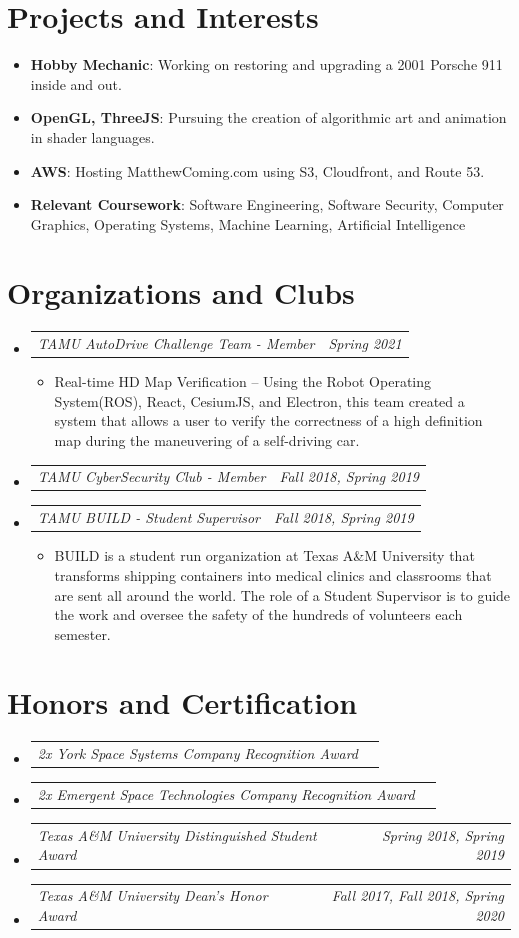 \documentclass[letterpaper,11pt]{article}
\makeatletter
\newcommand{\resumeItem}[2]{
  \item\small{
    \textbf{#1}{: #2 \vspace{-2pt}}
  }
}
\newcommand{\resumeAward}[2]{
  \vspace{-1pt}
    \item\begin{tabular*}{0.97\textwidth}{l@{\extracolsep{\fill}}r}
    \textit{\small#1} & \textit{\small #2} \\
    \end{tabular*}\vspace{-20pt}
}
\newcommand{\resumeJobDesc}[1]{
  \item\small{{ #1 \vspace{-2pt}}
  }
}
\newcommand{\resumeSubHeadingListStart}{\begin{itemize}[leftmargin=*]}
\newcommand{\resumeSubHeadingListEnd}{\end{itemize}}
\newcommand{\resumeItemListStart}{\begin{itemize}}
\newcommand{\resumeItemListEnd}{\end{itemize}\vspace{-5pt}}
\makeatother
\begin{document}
\section{Projects and Interests}
\begin{itemize}[leftmargin=*]
                  \resumeItem{Hobby Mechanic}{Working on restoring and upgrading a 2001 Porsche 911 inside and out.}
                  \vspace{-5pt}
                  \resumeItem{OpenGL, ThreeJS}{Pursuing the creation of algorithmic art and animation in shader languages.}
                  \vspace{-5pt}
                  \resumeItem{AWS}{Hosting MatthewComing.com using S3, Cloudfront, and Route 53.}
                  \vspace{-5pt}
                  \resumeItem{Relevant Coursework}{Software Engineering, Software Security, Computer Graphics, Operating Systems, Machine Learning, Artificial Intelligence}
                  \vspace{-5pt}
\end{itemize}

\section{Organizations and Clubs}
\resumeSubHeadingListStart
        \resumeAward{TAMU AutoDrive Challenge Team - Member}{Spring 2021}
        \vspace{0pt}
        \resumeItemListStart
                \resumeJobDesc{Real-time HD Map Verification -- Using the Robot Operating System(ROS), React, CesiumJS, and Electron, this team created a system that allows a user to verify the correctness of a high definition map during the maneuvering of a self-driving car. }
        \resumeItemListEnd
        \resumeAward{TAMU CyberSecurity Club - Member}{Fall 2018, Spring 2019}
        \resumeAward{TAMU BUILD - Student Supervisor}{Fall 2018, Spring 2019}
        \vspace{0pt} %
        \resumeItemListStart
                \resumeJobDesc{BUILD is a student run organization at Texas A\&M University that transforms shipping containers into medical clinics and classrooms that are sent all around the world. The role of a Student Supervisor is to guide the work and oversee the safety of the hundreds of volunteers each semester.}
        \resumeItemListEnd
\resumeSubHeadingListEnd

\section{Honors and Certification}
  \resumeSubHeadingListStart
    \resumeAward{2x York Space Systems Company Recognition Award}{}
    \resumeAward{2x Emergent Space Technologies Company Recognition Award}{}
    \resumeAward{Texas A\&M University Distinguished Student Award}{Spring 2018, Spring 2019}
    \resumeAward{Texas A\&M University Dean's Honor Award}{Fall 2017, Fall 2018, Spring 2020}
\resumeSubHeadingListEnd
\end{document}
